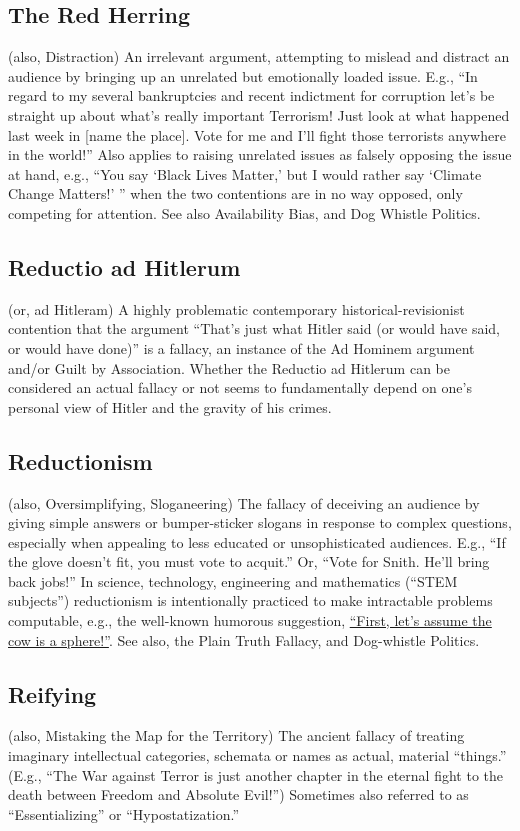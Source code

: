 \documentclass[10pt,a4paper,british]{article}
\begin{document}
\begin{multicols}{2}
	\subsection{The Red Herring} (also, Distraction) An irrelevant argument,
	attempting to mislead and distract an audience by bringing up an unrelated
	but emotionally loaded issue. E.g., ``In regard to my several bankruptcies
	and recent indictment for corruption let’s be straight up about what’s
	really important Terrorism!  Just look at what happened last week in [name
	the place]. Vote for me and I'll fight those terrorists anywhere in the
	world!''  Also applies to raising unrelated issues as falsely opposing the
	issue at hand, e.g., ``You say `Black Lives Matter,' but I would rather say
	`Climate Change Matters!' '' when the two contentions are in no way opposed,
	only competing for attention. See also Availability Bias, and Dog Whistle
	Politics.

	\subsection{Reductio ad Hitlerum} (or, ad Hitleram) A highly problematic
	contemporary historical{-}revisionist contention that the argument ``That's
	just what Hitler said (or would have said, or would have done)'' is a
	fallacy, an instance of the Ad Hominem argument and/or Guilt by
	Association. Whether the Reductio ad Hitlerum can be considered an actual
	fallacy or not seems to fundamentally depend on one's personal view of
	Hitler and the gravity of his crimes.

	\subsection{Reductionism} (also, Oversimplifying, Sloganeering) The fallacy
	of deceiving an audience by giving simple answers or bumper{-}sticker
	slogans in response to complex questions, especially when appealing to less
	educated or unsophisticated audiences. E.g., ``If the glove doesn’t fit,
	you must vote to acquit.'' Or, ``Vote for Snith. He'll bring back jobs!''
	In science, technology, engineering and mathematics (``STEM subjects'')
	reductionism is intentionally practiced to make intractable problems
	computable, e.g., the well{-}known humorous suggestion,
	\href{https://www.wired.com/2011/02/what-is-up-with-the-spherical-cow/}{``First,
	let's assume the cow is a sphere!''}. See also, the Plain Truth Fallacy,
	and Dog{-}whistle Politics.

	\subsection{Reifying} (also, Mistaking the Map for the Territory) The
	ancient fallacy of treating imaginary intellectual categories, schemata or
	names as actual, material ``things.'' (E.g., ``The War against Terror is
	just another chapter in the eternal fight to the death between Freedom and
	Absolute Evil!'') Sometimes also referred to as ``Essentializing'' or
	“Hypostatization.”


\end{multicols}
\end{document}
